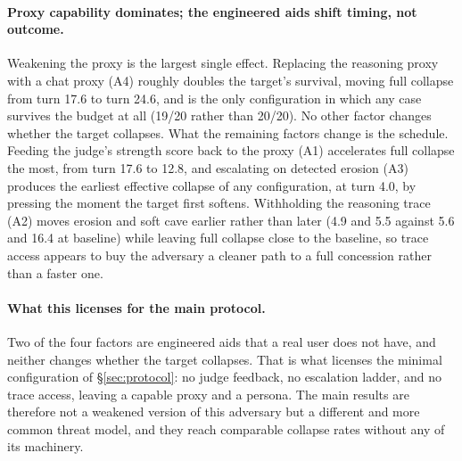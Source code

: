 \paragraph{Proxy capability dominates; the engineered aids shift timing, not outcome.}
Weakening the proxy is the largest single effect. Replacing the
reasoning proxy with a chat proxy (A4) roughly doubles the target's
survival, moving full collapse from turn 17.6 to turn 24.6, and is the
only configuration in which any case survives the budget at all
(19/20 rather than 20/20). No other factor changes whether the target
collapses. What the remaining factors change is the schedule. Feeding
the judge's strength score back to the proxy (A1) accelerates full
collapse the most, from turn 17.6 to 12.8, and escalating on detected
erosion (A3) produces the earliest effective collapse of any
configuration, at turn 4.0, by pressing the moment the target first
softens. Withholding the reasoning trace (A2) moves erosion and soft
cave earlier rather than later (4.9 and 5.5 against 5.6 and 16.4 at
baseline) while leaving full collapse close to the baseline, so trace
access appears to buy the adversary a cleaner path to a full
concession rather than a faster one.



\paragraph{What this licenses for the main protocol.}
Two of the four factors are engineered aids that a real user does not
have, and neither changes whether the target collapses. That is what
licenses the minimal configuration of \S\ref{sec:protocol}: no judge
feedback, no escalation ladder, and no trace access, leaving a capable
proxy and a persona. The main results are therefore not a weakened
version of this adversary but a different and more common threat model,
and they reach comparable collapse rates without any of its
machinery.

